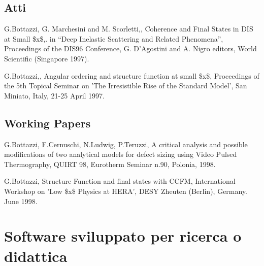 \documentclass[a4paper]{article}
\begin{document}
\subsection{Atti%
  \label{atti}%
}

G.Bottazzi, G. Marchesini and M. Scorletti,, Coherence and Final
States in DIS at Small \$x\$,.  in ``Deep Inelastic Scattering and
Related Phenomena'', Proceedings of the DIS96 Conference, G.
D'Agostini and A. Nigro editors, World Scientific (Singapore 1997).

G.Bottazzi,, Angular ordering and structure function at small \$x\$,
Proceedings of the 5th Topical Seminar on 'The Irresistible Rise of
the Standard Model', San Miniato, Italy, 21-25 April 1997.


\subsection{Working Papers%
  \label{id1}%
}

G.Bottazzi, F.Cernuschi, N.Ludwig, P.Teruzzi, A critical analysis and
possible modifications of two analytical models for defect sizing
using Video Pulsed Thermography, QUIRT 98, Eurotherm Seminar n.90,
Polonia, 1998.

G.Bottazzi, Structure Function and final states with CCFM,
International Workshop on 'Low \$x\$ Physics at HERA', DESY Zheuten
(Berlin), Germany. June 1998.


\section{Software sviluppato per ricerca o didattica%
  \label{software-sviluppato-per-ricerca-o-didattica}%
}
\end{document}
